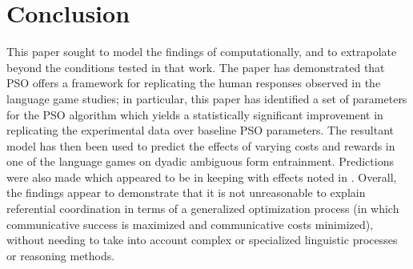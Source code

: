 \documentclass[11pt]{article}
\begin{document}
\section{Conclusion}
This paper sought to model the findings of \citeauthor{rohde2012} computationally, and to extrapolate beyond the conditions tested in that work. The paper has demonstrated that PSO offers a framework for replicating the human responses observed in the \citeauthor{rohde2012} language game studies; in particular, this paper has identified a set of parameters for the PSO algorithm which yields a statistically significant improvement in replicating the experimental data over baseline PSO parameters. The resultant model has then been used to predict the effects of varying costs and rewards in one of the \citeauthor{rohde2012} language games on dyadic ambiguous form entrainment. Predictions were also made which appeared to be in keeping with effects noted in \citeauthor{brennan1996}. Overall, the findings appear to demonstrate that it is not unreasonable to explain referential coordination in terms of a generalized optimization process (in which communicative success is maximized and communicative costs minimized), without needing to take into account complex or specialized linguistic processes or reasoning methods.










\end{document}
